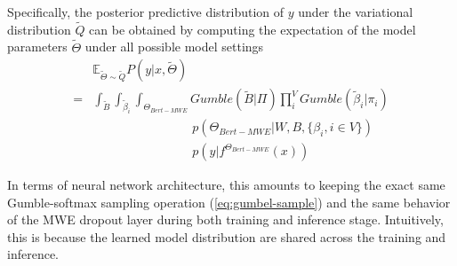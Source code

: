 Specifically, the posterior predictive distribution of $y$ under the variational distribution $\tilde{Q}$ can be obtained by computing the expectation of the model parameters $\tilde{\Theta}$ under all possible model settings
\begin{align}
& \mathbb{E}_{\tilde{\Theta} \sim \tilde{Q}} P (y | x, \tilde{\Theta}) \nonumber\\ 
= & \int_{\tilde{B}} \int_{\tilde{\beta}_i}\int_{\Theta_{Bert-MWE}} Gumble(\tilde{B} | \Pi) \prod_i^{V} Gumble(\tilde{\beta}_i | \pi_i) \nonumber\\ 
& \quad \quad \quad \quad \quad \quad \quad \quad p(\Theta_{Bert-MWE} \vert W, B, \{\beta_i, i \in V\}) \nonumber\\ 
& \quad \quad \quad \quad \quad \quad \quad \quad p(y \vert f^{\Theta_{Bert-MWE}}(x)) 
\label{eq:prediction}
\end{align}

In terms of neural network architecture, this amounts to keeping the exact same Gumble-softmax sampling operation (\autoref{eq:gumbel-sample}) and the same behavior of the MWE dropout layer during both training and inference stage. Intuitively, this is because the learned model distribution are shared across the training and inference.